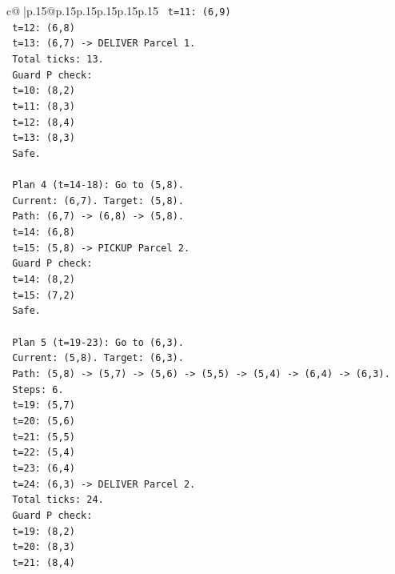 \documentclass{article}
\begin{document}
{\begin{supertabular}{c@{$\;$}|p{.15\linewidth}@{}p{.15\linewidth}p{.15\linewidth}p{.15\linewidth}p{.15\linewidth}p{.15\linewidth}}
{{{\texttt{   t=11: (6,9)} \\
\texttt{   t=12: (6,8)} \\
\texttt{   t=13: (6,7) {-}> DELIVER Parcel 1.} \\
\texttt{   Total ticks: 13.} \\
\texttt{   Guard P check:} \\
\texttt{   t=10: (8,2)} \\
\texttt{   t=11: (8,3)} \\
\texttt{   t=12: (8,4)} \\
\texttt{   t=13: (8,3)} \\
\texttt{   Safe.} \\
\\ 
\texttt{   Plan 4 (t=14{-}18): Go to (5,8).} \\
\texttt{   Current: (6,7). Target: (5,8).} \\
\texttt{   Path: (6,7) {-}> (6,8) {-}> (5,8).} \\
\texttt{   t=14: (6,8)} \\
\texttt{   t=15: (5,8) {-}> PICKUP Parcel 2.} \\
\texttt{   Guard P check:} \\
\texttt{   t=14: (8,2)} \\
\texttt{   t=15: (7,2)} \\
\texttt{   Safe.} \\
\\ 
\texttt{   Plan 5 (t=19{-}23): Go to (6,3).} \\
\texttt{   Current: (5,8). Target: (6,3).} \\
\texttt{   Path: (5,8) {-}> (5,7) {-}> (5,6) {-}> (5,5) {-}> (5,4) {-}> (6,4) {-}> (6,3).} \\
\texttt{   Steps: 6.} \\
\texttt{   t=19: (5,7)} \\
\texttt{   t=20: (5,6)} \\
\texttt{   t=21: (5,5)} \\
\texttt{   t=22: (5,4)} \\
\texttt{   t=23: (6,4)} \\
\texttt{   t=24: (6,3) {-}> DELIVER Parcel 2.} \\
\texttt{   Total ticks: 24.} \\
\texttt{   Guard P check:} \\
\texttt{   t=19: (8,2)} \\
\texttt{   t=20: (8,3)} \\
\texttt{   t=21: (8,4)} \\
}}}
\end{supertabular}}
\end{document}
